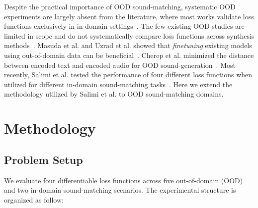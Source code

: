 \documentclass[10pt]{article} %
\newcommand{\anon}[1]{\textcolor[RGB]{255,50,150}{#1}}
\begin{document}
Despite the practical importance of OOD sound-matching, systematic OOD experiments are largely absent from the literature, where most works validate loss functions exclusively in in-domain settings~\cite{horner1993machine,mitchell2007evolutionary,yee2018automatic,han2023perceptual,vahidi2023mesostructures,barkan2019inversynth}.  The few existing OOD studies are limited in scope and do not systematically compare loss functions across synthesis methods~\cite{creativecherep2024,salimi2025evaluating}. Masuda et al. and Uzrad et al. showed that \textit{finetuning} existing models using out-of-domain data can be beneficial~\cite{masuda2021soundmatch,uzrad2024diffmoog}. Cherep et al. minimized the distance between encoded text and encoded audio for OOD sound-generation~\cite{creativecherep2024}. Most recently, \anon{Salimi et al.} tested the performance of four different loss functions when utilized for different in-domain sound-matching tasks~\cite{salimi2025evaluating}. Here we extend the methodology utilized by \anon{Salimi et al.} to OOD sound-matching domains.





\section{Methodology}
\label{sec:methodology}
\subsection{Problem Setup}
We evaluate four differentiable loss functions across five out-of-domain (OOD) and two in-domain sound-matching scenarios. The experimental structure is organized as follow:
\end{document}
